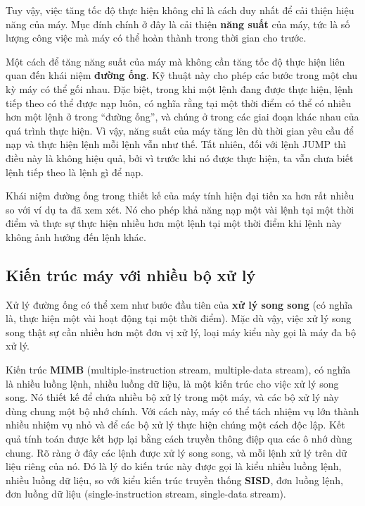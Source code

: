 Tuy vậy, việc tăng tốc độ thực hiện không chỉ là cách duy nhất để cải thiện hiệu năng của
máy. Mục đính chính ở đây là cải thiện \textbf{năng suất} của máy, tức là số lượng công
việc mà máy có thể hoàn thành trong thời gian cho trước.

Một cách để tăng năng suất của máy mà không cần tăng tốc độ thực hiện liên quan đến khái
niệm \textbf{đường ống}. Kỹ thuật này cho phép các bước trong một chu kỳ máy có thể gối
nhau. Đặc biệt, trong khi một lệnh đang được thực hiện, lệnh tiếp theo có thể được nạp
luôn, có nghĩa rằng tại một thời điểm có thể có nhiều hơn một lệnh ở trong ``đường ống'',
và chúng ở trong các giai đoạn khác nhau của quá trình thực hiện. Vì vậy, năng suất của
máy tăng lên dù thời gian yêu cầu để nạp và thực hiện lệnh mỗi lệnh vẫn như thế. Tất
nhiên, đối với lệnh JUMP thì điều này là không hiệu quả, bởi vì trước khi nó được thực
hiện, ta vẫn chưa biết lệnh tiếp theo là lệnh gì để nạp.

Khái niệm đường ống trong thiết kế của máy tính hiện đại tiến xa hơn rất nhiều so với ví
dụ ta đã xem xét. Nó cho phép khả năng nạp một vài lệnh tại một thời điểm và thực sự thực
hiện nhiều hơn một lệnh tại một thời điểm khi lệnh này không ảnh hưởng đến lệnh khác.
   
\subsection*{Kiến trúc máy với nhiều bộ xử lý}

Xử lý đường ống có thể xem như bước đầu tiên của \textbf{xử lý song song} (có nghĩa là,
thực hiện một vài hoạt động tại một thời điểm). Mặc dù vậy, việc xử lý song song thật sự
cần nhiều hơn một đơn vị xử lý, loại máy kiểu này gọi là máy đa bộ xử lý.

Kiến trúc \textbf{MIMB} (multiple-instruction stream, multiple-data stream), có nghĩa là
nhiều luồng lệnh, nhiều luồng dữ liệu, là một kiến trúc cho việc xử lý song song. Nó thiết
kế để chứa nhiều bộ xử lý trong một máy, và các bộ xử lý này dùng chung một bộ nhớ
chính. Với cách này, máy có thể tách nhiệm vụ lớn thành nhiều nhiệm vụ nhỏ và để các bộ xử
lý thực hiện chúng một cách độc lập.  Kết quả tính toán được kết hợp lại bằng cách truyền
thông điệp qua các ô nhớ dùng chung. Rõ ràng ở đây các lệnh được xử lý song song, và mỗi
lệnh xử lý trên dữ liệu riêng của nó. Đó là lý do kiến trúc này được gọi là kiểu nhiều
luồng lệnh, nhiều luồng dữ liệu, so với kiểu kiến trúc truyền thống \textbf{SISD}, đơn
luồng lệnh, đơn luồng dữ liệu (single-instruction stream, single-data stream).

